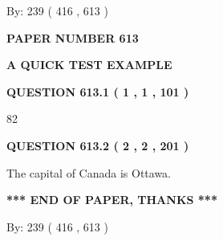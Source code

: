 \documentclass[12pt]{article}
\begin{document}
   
\hspace{1.0in} By: 
 239 ( 416 ,  613 )
   
   
   
   
\newpage 
\setcounter{page}{ 
   613001 } 
   
   
   
   
 {\textbf{ \Large{ PAPER NUMBER  613  }}}
   
   
\vspace{0.2in}
   
   
   
   
   
   
 \vspace{0.2in}
{\LARGE {\textbf{ A QUICK TEST EXAMPLE}}}
   
   
  
\vspace{0.2in}
  
{\textbf{\Large{QUESTION
613.1 
 ( 1 , 1 , 101 )
}}}
  
  
 
 
\noindent{}

82
 
 
  
\vspace{0.2in}
  
{\textbf{\Large{QUESTION
613.2 
 ( 2 , 2 , 201 )
}}}
  
  
 
 
\noindent{}
 
 
The capital of Canada is Ottawa.
 
 
 
 
   
   
 \vspace{0.2in}
 
   
   
   
   
\vspace{1.0in} 
{\textbf{\large{ *** END OF PAPER, THANKS *** }}} 
   
   
\hspace{1.0in} By: 
 239 ( 416 ,  613 )
   
   
   
\vspace{0.2in}
\vspace{0.2in}
   
\end{document}

